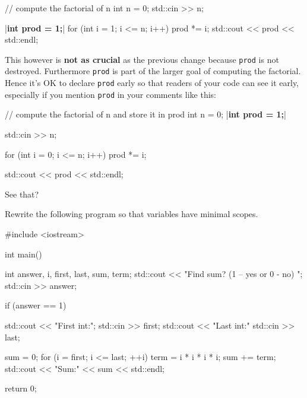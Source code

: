 \begin{consolethree}[escapeinside=||]
// compute the factorial of n
int n = 0;
std::cin >> n;

|\textbf{int prod = 1;}|
for (int i = 1; i <= n; i++)
{    
     prod *= i;
}
std::cout << prod << std::endl;
\end{consolethree}

This however is \textbf{not as crucial} as the previous change because \texttt{prod} is not destroyed. Furthermore \texttt{prod} is part of the larger goal of computing the factorial. Hence it's OK to declare \texttt{prod} early so that readers of your code can see it early, especially if you mention \texttt{prod} in your comments like this:

\begin{consolethree}[escapeinside=||]
// compute the factorial of n and store it in prod
int n = 0;
|\textbf{int prod = 1;}|

std::cin >> n;

for (int i = 0; i <= n; i++)
{    
     prod *= i;
}

std::cout << prod << std::endl;
\end{consolethree}

See that?

\begin{ex} Rewrite the following program so that variables have minimal scopes.

\begin{console}
#include <iostream>

int main()
{   
     int answer, i, first, last, sum, term;
     std::cout << "Find sum? (1 -- yes or 0 - no) ";
     std::cin >> answer;
     
     if (answer == 1)
     {    
          std::cout << "First int:";
          std::cin >> first;
          std::cout << "Last int:"
          std::cin >> last;

          sum = 0;
          for (i = first; i <= last; ++i)
          {    
               term = i * i * i * i;
               sum += term;
          }
          std::cout << "Sum:" << sum << std::endl;
     }

     return 0;
}
\end{console}

\end{ex}



